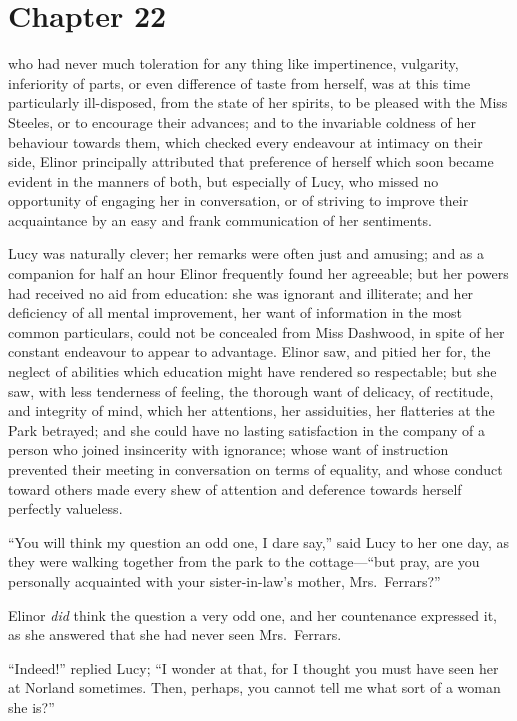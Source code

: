 \chapter{Chapter 22}


 who had never much toleration for any
thing like impertinence, vulgarity, inferiority of parts,
or even difference of taste from herself, was at
this time particularly ill-disposed, from the state
of her spirits, to be pleased with the Miss Steeles,
or to encourage their advances; and to the invariable
coldness of her behaviour towards them, which checked every
endeavour at intimacy on their side, Elinor principally
attributed that preference of herself which soon became
evident in the manners of both, but especially of Lucy,
who missed no opportunity of engaging her in conversation,
or of striving to improve their acquaintance by an easy
and frank communication of her sentiments.

Lucy was naturally clever; her remarks were often
just and amusing; and as a companion for half an hour
Elinor frequently found her agreeable; but her powers
had received no aid from education: she was ignorant
and illiterate; and her deficiency of all mental improvement,
her want of information in the most common particulars,
could not be concealed from Miss Dashwood, in spite of her
constant endeavour to appear to advantage.  Elinor saw,
and pitied her for, the neglect of abilities which education
might have rendered so respectable; but she saw, with less
tenderness of feeling, the thorough want of delicacy,
of rectitude, and integrity of mind, which her attentions,
her assiduities, her flatteries at the Park betrayed;
and she could have no lasting satisfaction in the company
of a person who joined insincerity with ignorance;
whose want of instruction prevented their meeting
in conversation on terms of equality, and whose conduct
toward others made every shew of attention and deference
towards herself perfectly valueless.

``You will think my question an odd one, I dare say,''
said Lucy to her one day, as they were walking together
from the park to the cottage---``but pray, are you
personally acquainted with your sister-in-law's mother,
Mrs.\ Ferrars?''

Elinor \emph{did} think the question a very odd one,
and her countenance expressed it, as she answered that she
had never seen Mrs.\ Ferrars.

``Indeed!'' replied Lucy; ``I wonder at that, for I
thought you must have seen her at Norland sometimes.
Then, perhaps, you cannot tell me what sort of a woman
she is?''

